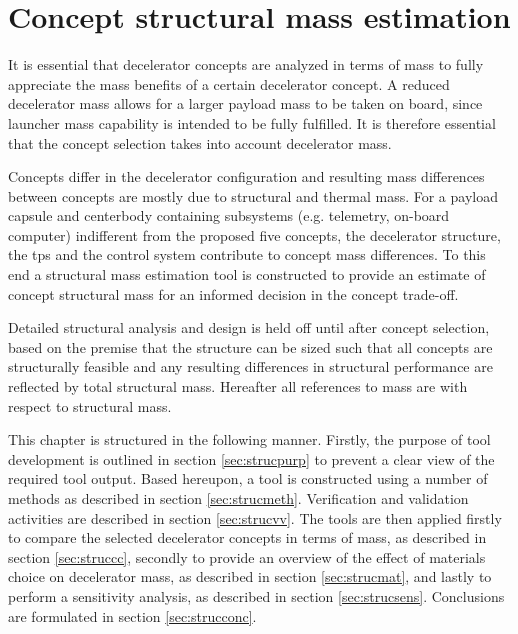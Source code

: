 \section{Concept structural mass estimation} \label{ch:strucmass}
It is essential that decelerator concepts are analyzed in terms of mass to fully appreciate the mass benefits of a certain decelerator concept. A reduced decelerator mass allows for a larger payload mass to be taken on board, since launcher mass capability is intended to be fully fulfilled. It is therefore essential that the concept selection takes into account decelerator mass. 

Concepts differ in the decelerator configuration and resulting mass differences between concepts are mostly due to structural and thermal mass. For a payload capsule and centerbody containing subsystems (e.g. telemetry, on-board computer) indifferent from the proposed five concepts, the decelerator structure, the \acrfull{tps} and the control system contribute to concept mass differences. To this end a structural mass estimation tool is constructed to provide an estimate of concept structural mass for an informed decision in the concept trade-off. 

Detailed structural analysis and design is held off until after concept selection, based on the premise that the structure can be sized such that all concepts are structurally feasible and any resulting differences in structural performance are reflected by total structural mass. Hereafter all references to mass are with respect to structural mass.

This chapter is structured in the following manner. Firstly, the purpose of tool development is outlined in section \ref{sec:strucpurp} to prevent a clear view of the required tool output. Based hereupon, a tool is constructed using a number of methods as described in section \ref{sec:strucmeth}. Verification and validation activities are described in section \ref{sec:strucvv}. The tools are then applied firstly to compare the selected decelerator concepts in terms of mass, as described in section \ref{sec:struccc}, secondly to provide an overview of the effect of materials choice on decelerator mass, as described in section \ref{sec:strucmat}, and lastly to perform a sensitivity analysis, as described in section \ref{sec:strucsens}. Conclusions are formulated in section \ref{sec:strucconc}.

